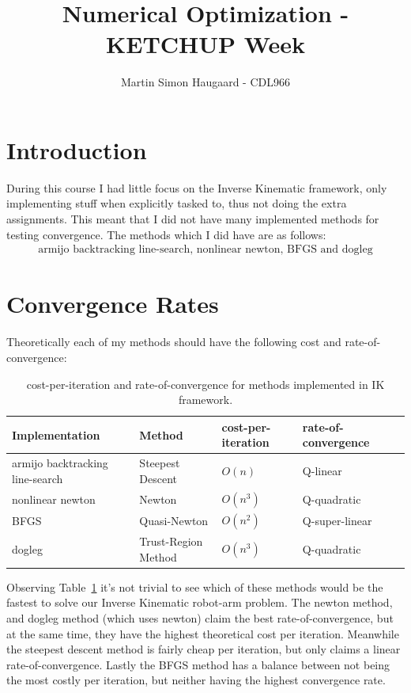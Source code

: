 \documentclass[11pt]{article} %
\title{Numerical Optimization - KETCHUP Week}
\author{Martin Simon Haugaard - CDL966}
\begin{document}
\maketitle
\section*{Introduction}
During this course I had little focus on the Inverse Kinematic framework, only implementing stuff when explicitly tasked to, thus not doing the extra assignments. This meant that I did not have many implemented methods for testing convergence. The methods which I did have are as follows:
\begin{gather*}
\text{armijo backtracking line-search, nonlinear newton, BFGS and dogleg}
\end{gather*}
\section*{Convergence Rates}
Theoretically each of my methods should have the following cost and rate-of-convergence:
\begin{table}[h!]
\begin{tabular}{lllll}
Implementation & Method & cost-per-iteration & rate-of-convergence\\
\hline
armijo backtracking line-search & Steepest Descent& $O(n)$ & Q-linear &\\
nonlinear newton &Newton & $O(n^3)$ & Q-quadratic & \\
BFGS & Quasi-Newton & $O(n^2)$ & Q-super-linear & \\
dogleg & Trust-Region Method & $O(n^3)$ & Q-quadratic\\
\end{tabular}
\caption{cost-per-iteration and rate-of-convergence for methods implemented in IK framework.}
\label{table:con}
\end{table}

Observing Table~\ref{table:con} it's not trivial to see which of these methods would be the fastest to solve our Inverse Kinematic robot-arm problem. The newton method, and dogleg method (which uses newton) claim the best rate-of-convergence, but at the same time, they have the highest theoretical cost per iteration. Meanwhile the steepest descent method is fairly cheap per iteration, but only claims a linear rate-of-convergence. Lastly the BFGS method has a balance between not being the most costly per iteration, but neither having the highest convergence rate.
\end{document}

